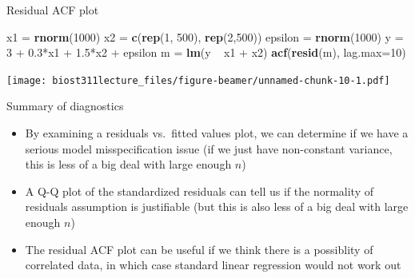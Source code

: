 \documentclass[12pt,ignorenonframetext,]{beamer}
\newenvironment{Shaded}{\begin{snugshade}}{\end{snugshade}}
\newcommand{\KeywordTok}[1]{\textcolor[rgb]{0.13,0.29,0.53}{\textbf{{#1}}}}
\newcommand{\DataTypeTok}[1]{\textcolor[rgb]{0.13,0.29,0.53}{{#1}}}
\newcommand{\DecValTok}[1]{\textcolor[rgb]{0.00,0.00,0.81}{{#1}}}
\newcommand{\FloatTok}[1]{\textcolor[rgb]{0.00,0.00,0.81}{{#1}}}
\newcommand{\StringTok}[1]{\textcolor[rgb]{0.31,0.60,0.02}{{#1}}}
\newcommand{\NormalTok}[1]{{#1}}
\providecommand{\tightlist}{%
\setlength{\itemsep}{0pt}\setlength{\parskip}{0pt}}
\begin{document}
\begin{frame}[fragile]{Residual ACF plot}

\tiny

\begin{Shaded}
\begin{Highlighting}[]
\NormalTok{x1 =}\StringTok{ }\KeywordTok{rnorm}\NormalTok{(}\DecValTok{1000}\NormalTok{)}
\NormalTok{x2 =}\StringTok{ }\KeywordTok{c}\NormalTok{(}\KeywordTok{rep}\NormalTok{(}\DecValTok{1}\NormalTok{, }\DecValTok{500}\NormalTok{), }\KeywordTok{rep}\NormalTok{(}\DecValTok{2}\NormalTok{,}\DecValTok{500}\NormalTok{))}
\NormalTok{epsilon =}\StringTok{ }\KeywordTok{rnorm}\NormalTok{(}\DecValTok{1000}\NormalTok{)}
\NormalTok{y =}\StringTok{ }\DecValTok{3} \NormalTok{+}\StringTok{ }\FloatTok{0.3}\NormalTok{*x1 +}\StringTok{ }\FloatTok{1.5}\NormalTok{*x2 +}\StringTok{ }\NormalTok{epsilon}
\NormalTok{m =}\StringTok{ }\KeywordTok{lm}\NormalTok{(y ~}\StringTok{ }\NormalTok{x1 +}\StringTok{ }\NormalTok{x2)}
\KeywordTok{acf}\NormalTok{(}\KeywordTok{resid}\NormalTok{(m), }\DataTypeTok{lag.max=}\DecValTok{10}\NormalTok{) }
\end{Highlighting}
\end{Shaded}

\texttt{[image: biost311lecture\_files/figure-beamer/unnamed-chunk-10-1.pdf]}

\normalsize

\end{frame}

\begin{frame}{Summary of diagnostics}

\begin{itemize}
\tightlist
\item
  By examining a residuals vs.~fitted values plot, we can determine if
  we have a serious model misspecification issue (if we just have
  non-constant variance, this is less of a big deal with large enough
  \(n\))
\item
  A Q-Q plot of the standardized residuals can tell us if the normality
  of residuals assumption is justifiable (but this is also less of a big
  deal with large enough \(n\))
\item
  The residual ACF plot can be useful if we think there is a possiblity
  of correlated data, in which case standard linear regression would not
  work out
\end{itemize}

\end{frame}
\end{document}
